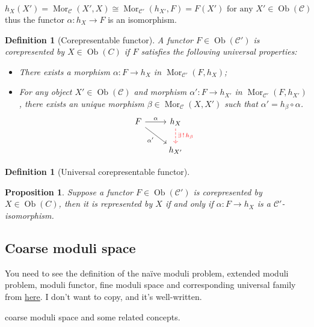 \documentclass[reqno,11pt]{amsart}
\numberwithin{equation}{section}
\theoremstyle{plain}
\newtheorem{proposition}[theorem]{Proposition}
\newtheorem{defn}[theorem]{Definition}
\theoremstyle{plain}
\numberwithin{equation}{section}
\theoremstyle{remark}
\newcommand{\Ob}{\operatorname{Ob}}
\newcommand{\Mor}{\operatorname{Mor}}
\begin{document}
$$h_X(X')=\Mor_{\mathcal{C}}(X',X) \cong \Mor_{\mathcal{C}'}(h_{X'},F) =F(X') \text{ for any } X'\in \Ob(\mathcal{C})$$
thus the functor $\alpha: h_X \longrightarrow F$ is an isomorphism.
\begin{defn}[Corepresentable functor]
A functor $F\in \Ob(\mathcal{C}')$ is corepresented by $X \in \Ob(C)$ if $F$ satisfies the following universal properties:
\begin{itemize}
\item There exists a morphism $\alpha:F \longrightarrow h_X$ in $\Mor_{\mathcal{C}'}(F,h_X)$;
\item For any object $X' \in \Ob(\mathcal{C})$ and morphism $\alpha':F\longrightarrow h_{X'}$ in $\Mor_{\mathcal{C}'}(F,h_{X'})$, there exists an unique morphism $\beta \in \Mor_{\mathcal{C}}(X,X')$ such that $\alpha'=h_{\beta} \circ \alpha$.
$$\begin{tikzcd}
	F & {h_X} \\
	& {h_{X'}}
	\arrow["\alpha", from=1-1, to=1-2]
	\arrow["{\exists \,! \,h_{\beta}}", color={rgb,255:red,255;green,0;blue,8}, dashed, from=1-2, to=2-2]
	\arrow["{\alpha'}"', from=1-1, to=2-2]
\end{tikzcd}$$
\end{itemize}
\end{defn}
\begin{defn}[Universal corepresentable functor]

\end{defn}
\begin{proposition}
Suppose a functor $F\in \Ob(\mathcal{C}')$ is corepresented by $X \in \Ob(C)$, then it is represented by $X$ if and only if $\alpha:F \longrightarrow h_X$ is a $\mathcal{C}'$-isomorphism.
\end{proposition}
\subsection{Coarse moduli space}
You need to see the definition of the naïve moduli problem, extended moduli problem, moduli functor, fine moduli space and corresponding universal family from  \href{https://userpage.fu-berlin.de/hoskins/moduli_and_GIT.html}{here}. I don't want to copy, and it's well-written.

coarse moduli space and some related concepts. 
\end{document}
